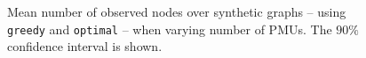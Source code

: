 {\begin{figure}[t]
\begin{center}
  \end{center}
	\caption{Mean number of observed nodes over synthetic graphs -- using {\tt greedy} and {\tt optimal} -- when varying number of PMUs. The $90\%$ confidence interval is shown.}
  \label{fig:maxinc-res}
\end{figure}

\begin{figure}[t]
  \begin{center}

\end{center}
\end{figure}}
